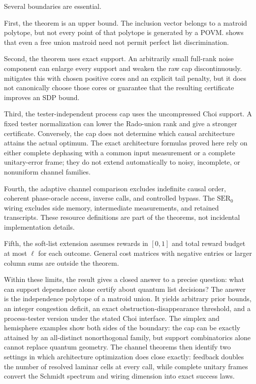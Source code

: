 \documentclass[11pt]{article}
\theoremstyle{definition}
\theoremstyle{remark}
\begin{document}
Several boundaries are essential.

First, the theorem is an upper bound.  The inclusion vector belongs to a
matroid polytope, but not every point of that polytope is generated by a POVM.
 shows that even a free union matroid need not permit
perfect list discrimination.

Second, the theorem uses exact support.  An arbitrarily small full-rank noise
component can enlarge every support and weaken the raw cap discontinuously.
 mitigates this with chosen positive cores and an explicit
tail penalty, but it does not canonically choose those cores or guarantee that
the resulting certificate improves an SDP bound.

Third, the tester-independent process cap uses the uncompressed Choi support.
A fixed tester normalization can lower the Rado-union rank and give a stronger
certificate.  Conversely, the cap does not determine which causal
architecture attains the actual optimum.  The exact architecture formulas
proved here rely on either complete dephasing with a common input measurement
or a complete unitary-error frame; they do not extend automatically to noisy,
incomplete, or nonuniform channel families.

Fourth, the adaptive channel comparison excludes indefinite causal order,
coherent phase-oracle access, inverse calls, and controlled bypass.  The
$\mathrm{SER}_0$ wiring excludes side memory, intermediate measurements, and
retained transcripts.  These resource definitions are part of the theorems,
not incidental implementation details.

Fifth, the soft-list extension assumes rewards in $[0,1]$ and total reward
budget at most $\ell$ for each outcome.  General cost matrices with negative
entries or larger column sums are outside the theorem.

Within these limits, the result gives a closed answer to a precise question:
what can support dependence alone certify about quantum list decisions?  The
answer is the independence polytope of a matroid union.  It yields arbitrary
prior bounds, an integer congestion deficit, an exact obstruction-disappearance
threshold, and a process-tester version under the stated Choi interface.  The simplex and hemisphere
examples show both sides of the boundary: the cap can be exactly attained by
an all-distinct nonorthogonal family, but support combinatorics alone cannot
replace quantum geometry.  The channel theorems then identify two settings in
which architecture optimization does close exactly: feedback doubles the
number of resolved laminar cells at every call, while complete unitary frames
convert the Schmidt spectrum and wiring dimension into exact success laws.
\end{document}
